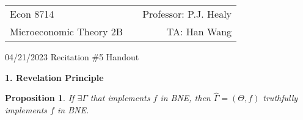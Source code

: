 \documentclass[11pt,leqno]{article}
\newtheorem{proposition}{Proposition}
\begin{document}
\vspace*{-20mm}

\begin{tabular*}{\textwidth}{@{\extracolsep{\fill}}lcr}
Econ 8714     & \hfill    &         Professor: P.J. Healy          \\
Microeconomic Theory 2B  &           &   TA: Han Wang    
\end{tabular*}

\bigskip
\begin{center}
{\Large 04/21/2023 Recitation \#5 Handout}
\end{center}

\bigskip


\textbf{1. Revelation Principle}

\begin{proposition}
If $\exists \Gamma$ that implements $f$ in BNE, then $\hat{\Gamma}=(\Theta,f)$ truthfully implements $f$ in BNE.
\end{proposition}
\end{document}
